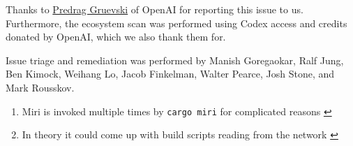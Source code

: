 \documentclass[11pt,a4paper]{article}
\begin{document}
Thanks to \href{https://github.com/obi1kenobi}{Predrag Gruevski} of OpenAI for reporting this issue to us. Furthermore, the ecosystem scan was performed using Codex access and credits donated by OpenAI, which we also thank them for.

Issue triage and remediation was performed by Manish Goregaokar, Ralf Jung, Ben Kimock, Weihang Lo, Jacob Finkelman, Walter Pearce, Josh Stone, and Mark Rousskov.

\begin{enumerate}
\item Miri is invoked multiple times by \texttt{cargo miri} for complicated reasons \href{https://blog.rust-lang.org/2026/09/21/github-actions-leaking-secrets-when-miri-output-is-cached/\#fr-1-1}{↩}
\item In theory it could come up with build scripts reading from the network \href{https://blog.rust-lang.org/2026/09/21/github-actions-leaking-secrets-when-miri-output-is-cached/\#fr-2-1}{↩}
\end{enumerate}
\end{document}
